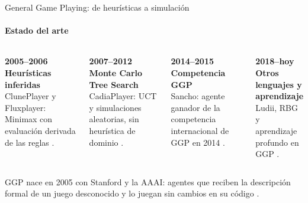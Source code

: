 \documentclass[aspectratio=169,10pt,t]{beamer}
\begin{document}
\begin{frame}{General Game Playing: de heurísticas a simulación}
\framesubtitle{Estado del arte}
\renewcommand{\tarjetaalto}{3.15cm}
\begin{columns}[T]
\begin{tarjeta}
{\scriptsize\bfseries\color{vino} 2005--2006}\\[1pt]
{\bfseries Heurísticas inferidas}\\[2pt]
\footnotesize ClunePlayer y Fluxplayer: Minimax con evaluación derivada de las reglas \cite{Clune2007ClunePlayer, Schiffel2007Fluxplayer}.
\end{tarjeta}
\begin{tarjeta}[azulp]
{\scriptsize\bfseries\color{azulp} 2007--2012}\\[1pt]
{\bfseries Monte Carlo Tree Search}\\[2pt]
\footnotesize CadiaPlayer: UCT y simulaciones aleatorias, sin heurística de dominio \cite{Finnsson2008CadiaPlayer}.
\end{tarjeta}
\begin{tarjeta}
{\scriptsize\bfseries\color{vino} 2014--2015}\\[1pt]
{\bfseries Competencia GGP}\\[2pt]
\footnotesize Sancho: agente ganador de la competencia internacional de GGP en 2014 \cite{DraperRose2014Sancho}.
\end{tarjeta}
\begin{tarjeta}[azulp]
{\scriptsize\bfseries\color{azulp} 2018--hoy}\\[1pt]
{\bfseries Otros lenguajes y aprendizaje}\\[2pt]
\footnotesize Ludii, RBG y aprendizaje profundo en GGP \cite{Browne2020Ludii, Kowalski2019RBG, Goldwaser2020DRLGGP}.
\end{tarjeta}
\end{columns}
\vspace{5pt}
{\small GGP nace en 2005 con Stanford y la AAAI: agentes que reciben la descripción formal de un juego desconocido y lo juegan sin cambios en su código \cite{Genesereth2005GGP}.\par}
\end{frame}
\end{document}
